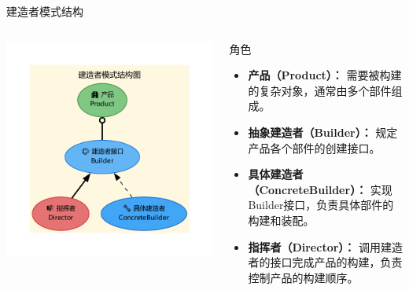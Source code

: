 \documentclass[UTF8,aspectratio=169]{beamer}
\begin{document}
\begin{frame}{建造者模式结构}
    \begin{columns}
        \begin{column}{0.48\textwidth}
            \includegraphics[width=1.0\textwidth]{images/builder_pattern.pdf}
        \end{column}
        \begin{column}{0.48\textwidth}
            \begin{ytublock}{角色}
            \begin{itemize}
                \item \textbf{产品（Product）：} 需要被构建的复杂对象，通常由多个部件组成。
                \item \textbf{抽象建造者（Builder）：} 规定产品各个部件的创建接口。
                \item \textbf{具体建造者（ConcreteBuilder）：} 实现Builder接口，负责具体部件的构建和装配。
                \item \textbf{指挥者（Director）：} 调用建造者的接口完成产品的构建，负责控制产品的构建顺序。
            \end{itemize}
            \end{ytublock}
        \end{column}
    \end{columns}
\end{frame}
\end{document}
